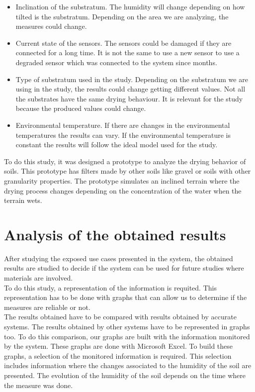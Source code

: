 \begin{itemize}

\item Inclination of the substratum. The humidity will change depending on how tilted is the substratum. Depending on the area we are analyzing, the measures could change.

\item Current state of the sensors. The sensors could be damaged if they are connected for a long time. It is not the same to use a new sensor to use a degraded sensor which was connected to the system since months.

\item Type of substratum used in the study. Depending on the substratum we are using in the study, the results could change getting different values. Not all the substrates have the same drying behaviour. It is relevant for the study because the produced values could change.

\item Environmental temperature. If there are changes in the environmental temperatures the results can vary. If the environmental temperature is constant the results will follow the ideal model used for the study.

\end{itemize}

To do this study, it was designed a prototype to analyze the drying behavior of soils. This prototype has filters made by other soils like gravel or soils with other granularity properties. The prototype simulates an inclined terrain where the drying process changes depending on the concentration of the water when the terrain wets.

\section{Analysis of the obtained results}

After studying the exposed use cases presented in the system, the obtained results are studied to decide if the system can be used for future studies where materials are involved.\\

To do this study, a representation of the information is requited. This representation has to be done with graphs that can allow us to determine if the measures are reliable or not.\\

The results obtained have to be compared with results obtained by accurate systems. The results obtained by other systems have to be represented in graphs too. To do this comparison, our graphs are built with the information monitored by the system. These graphs are done with Microsoft Excel. To build these graphs, a selection of the monitored information is required. This selection includes information where the changes associated to the humidity of the soil are presented. The evolution of the humidity of the soil depends on the time where the measure was done.\\

